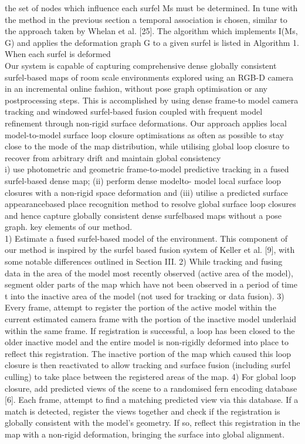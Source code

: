 \documentclass[12pt,twoside]{article}
\begin{document}
the set of
nodes which influence each surfel Ms must be determined.
In tune with the method in the previous section a temporal
association is chosen, similar to the approach taken by Whelan
et al. [25]. The algorithm which implements I(Ms, G) and
applies the deformation graph G to a given surfel is listed
in Algorithm 1. When each surfel is deformed\\

Our system is capable of capturing comprehensive
dense globally consistent surfel-based maps of room scale environments
explored using an RGB-D camera in an incremental
online fashion, without pose graph optimisation or any postprocessing
steps. This is accomplished by using dense frame-to model
camera tracking and windowed surfel-based fusion coupled
with frequent model refinement through non-rigid surface
deformations. Our approach applies local model-to-model surface
loop closure optimisations as often as possible to stay close to the
mode of the map distribution, while utilising global loop closure
to recover from arbitrary drift and maintain global consistency\\

i) use
photometric and geometric frame-to-model predictive tracking
in a fused surfel-based dense map; (ii) perform dense modelto-
model local surface loop closures with a non-rigid space
deformation and (iii) utilise a predicted surface appearancebased
place recognition method to resolve global surface loop
closures and hence capture globally consistent dense surfelbased
maps without a pose graph.
key elements of our method.\\
1) Estimate a fused surfel-based model of the environment.
This component of our method is inspired by the surfel based
fusion system of Keller et al. [9], with some
notable differences outlined in Section III.
2) While tracking and fusing data in the area of the
model most recently observed (active area of the model),
segment older parts of the map which have not been
observed in a period of time t into the inactive area of
the model (not used for tracking or data fusion).
3) Every frame, attempt to register the portion of the active
model within the current estimated camera frame with
the portion of the inactive model underlaid within the
same frame. If registration is successful, a loop has
been closed to the older inactive model and the entire
model is non-rigidly deformed into place to reflect this
registration. The inactive portion of the map which
caused this loop closure is then reactivated to allow
tracking and surface fusion (including surfel culling) to
take place between the registered areas of the map.
4) For global loop closure, add predicted views of the
scene to a randomised fern encoding database [6]. Each
frame, attempt to find a matching predicted view via this
database. If a match is detected, register the views together
and check if the registration is globally consistent
with the model’s geometry. If so, reflect this registration
in the map with a non-rigid deformation, bringing the
surface into global alignment.
\end{document}
